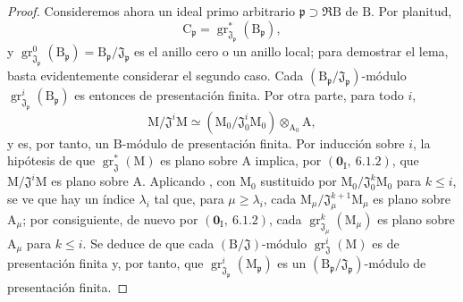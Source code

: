 \begin{proof}
Consideremos ahora un ideal primo arbitrario $\mathfrak{p}\supset\mathfrak{R}\mathrm{B}$ de $\mathrm{B}$. Por planitud,
\[
  \mathrm{C}_\mathfrak{p}
  =\operatorname{gr}^*_{\mathfrak{J}_\mathfrak{p}}(\mathrm{B}_\mathfrak{p}),
\]
y $\operatorname{gr}^0_{\mathfrak{J}_\mathfrak{p}}(\mathrm{B}_\mathfrak{p})=\mathrm{B}_\mathfrak{p}/\mathfrak{J}_\mathfrak{p}$ es el anillo cero o un anillo local; para demostrar el lema, basta evidentemente considerar el segundo caso. Cada $(\mathrm{B}_\mathfrak{p}/\mathfrak{J}_\mathfrak{p})$-módulo $\operatorname{gr}^i_{\mathfrak{J}_\mathfrak{p}}(\mathrm{B}_\mathfrak{p})$ es entonces de presentación finita. Por otra parte, para todo $i$,
\[
  \mathrm{M}/\mathfrak{J}^i\mathrm{M}
  \simeq
  (\mathrm{M}_0/\mathfrak{J}_0^i\mathrm{M}_0)
  \otimes_{\mathrm{A}_0}\mathrm{A},
\]
y es, por tanto, un $\mathrm{B}$-módulo de presentación finita. Por inducción sobre $i$, la hipótesis de que $\operatorname{gr}^*_\mathfrak{J}(\mathrm{M})$ es plano sobre $\mathrm{A}$ implica, por $(\mathbf{0}_\mathrm{I},~6.1.2)$, que $\mathrm{M}/\mathfrak{J}^i\mathrm{M}$ es plano sobre $\mathrm{A}$. Aplicando , con $\mathrm{M}_0$ sustituido por $\mathrm{M}_0/\mathfrak{J}_0^k\mathrm{M}_0$ para $k\leqslant i$, se ve que hay un índice $\lambda_i$ tal que, para $\mu\geqslant\lambda_i$, cada $\mathrm{M}_\mu/\mathfrak{J}_\mu^{k+1}\mathrm{M}_\mu$ es plano sobre $\mathrm{A}_\mu$; por consiguiente, de nuevo por $(\mathbf{0}_\mathrm{I},~6.1.2)$, cada $\operatorname{gr}^k_{\mathfrak{J}_\mu}(\mathrm{M}_\mu)$ es plano sobre $\mathrm{A}_\mu$ para $k\leqslant i$. Se deduce de  que cada $(\mathrm{B}/\mathfrak{J})$-módulo $\operatorname{gr}^i_\mathfrak{J}(\mathrm{M})$ es de presentación finita y, por tanto, que $\operatorname{gr}^i_{\mathfrak{J}_\mathfrak{p}}(\mathrm{M}_\mathfrak{p})$ es un $(\mathrm{B}_\mathfrak{p}/\mathfrak{J}_\mathfrak{p})$-módulo de presentación finita.


\end{proof}
